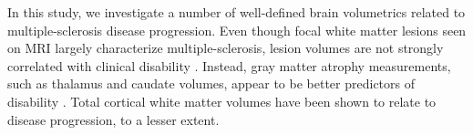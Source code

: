 In this study, we investigate a number of well-defined brain volumetrics related to multiple-sclerosis disease progression. Even though focal white matter lesions seen on MRI largely characterize multiple-sclerosis, lesion volumes are not strongly correlated with clinical disability \cite{lesions1,lesions2,lesions3}. Instead, gray matter atrophy measurements, such as thalamus \cite{thal1,thal2,thal3,thal4} and caudate \cite{caud1,caud2} volumes, appear to be better predictors of disability \cite{gm1,gm2,gm3,gm4}. Total cortical white matter volumes \cite{white1} have been shown to relate to disease progression, to a lesser extent. %